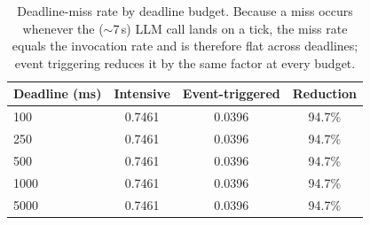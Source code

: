 \begin{table}[!tbp]
\centering
\caption{Deadline-miss rate by deadline budget. Because a miss occurs whenever the (\(\sim\)7\,s) LLM call lands on a tick, the miss rate equals the invocation rate and is therefore flat across deadlines; event triggering reduces it by the same factor at every budget.}
\label{tab:deadline}
\footnotesize
\begin{tabular}{lccc}
\toprule
\textbf{Deadline (ms)} & \textbf{Intensive} & \textbf{Event-triggered} & \textbf{Reduction} \\
\midrule
100 & 0.7461 & 0.0396 & 94.7\% \\
250 & 0.7461 & 0.0396 & 94.7\% \\
500 & 0.7461 & 0.0396 & 94.7\% \\
1000 & 0.7461 & 0.0396 & 94.7\% \\
5000 & 0.7461 & 0.0396 & 94.7\% \\
\bottomrule
\end{tabular}
\end{table}
